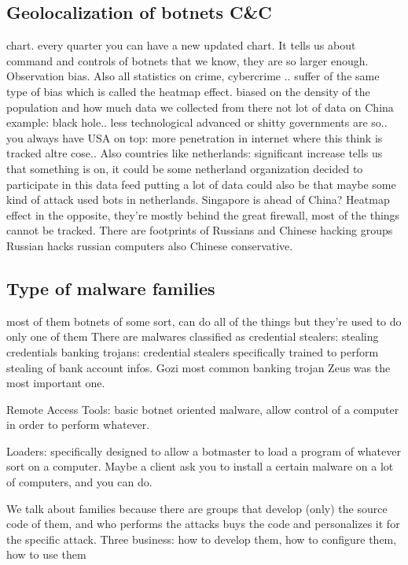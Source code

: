     \subsection{Geolocalization of botnets C&C}
        chart. every quarter you can have a new updated chart.
        It tells us about command and controls of botnets that we know, they are so larger enough.
        Observation bias.
        Also all statistics on crime, cybercrime .. suffer of the same type of bias which is called the heatmap effect.
        biased on the density of the population and how much data we collected from there
        not lot of data on China example: black hole..
        less technological advanced or shitty governments are so..
        you always have USA on top:
            more penetration in internet
            where this think is tracked
            altre cose..
        Also countries like netherlands: significant increase tells us that something is on, it could be some netherland organization decided to participate in this data feed putting a lot of data
            could also be that maybe some kind of attack used bots in netherlands.
        Singapore is ahead of China?
            Heatmap effect in the opposite, they're mostly behind the great firewall, most of the things cannot be tracked.
        There are footprints of Russians and Chinese hacking groups 
            Russian hacks russian computers also
            Chinese conservative.
    \subsection{Type of malware families}
        most of them botnets of some sort, can do all of the things but they're used to do only one of them
        There are malwares classified as credential stealers: stealing credentials
        banking trojans: credential stealers specifically trained to perform stealing of bank account infos.
        Gozi most common banking trojan
        Zeus was the most important one.

        Remote Access Tools: basic botnet oriented malware, allow control of a computer in order to perform whatever.

        Loaders: specifically designed to allow a botmaster to load a program of whatever sort on a computer. Maybe a client ask you to install a certain malware on a lot of computers, and you can do.

        We talk about families because there are groups that develop (only) the source code of them, and who performs the attacks buys the code and personalizes it for the specific attack.
        Three business: how to develop them, how to configure them, how to use them

